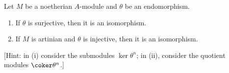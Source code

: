 Let $M$ be a noetherian $A$-module and $\theta$ be an endomorphism.
\begin{enumerate}[label=(\roman*)]
	\item If $\theta$ is surjective, then it is an isomorphism.
	\item If $M$ is artinian and $\theta$ is injective, then it is an
		isomorphism.
\end{enumerate}

[Hint: in (i) consider the submodules $\ker\theta^n$; in (ii), consider the quotient
modules $\coker\theta^n$.]

